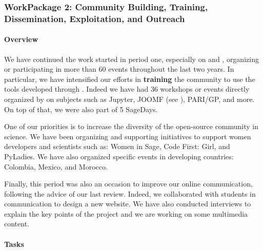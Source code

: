 \subsubsection{WorkPackage 2:  Community Building, Training, Dissemination, Exploitation, and Outreach}
\label{dissem}



\paragraph{Overview}

  We have continued the work started in period one, especially on  and
  , organizing or participating in more than 60 events throughout the last two years.
  In particular, we have intensified our efforts in \textbf{training} the community to use the tools developed through \ODK.
  Indeed we have had 36 workshops or events directly organized by \ODK on subjects such as Jupyter, JOOMF (see ), PARI/GP, and more. On top of that, we were also part of 5 SageDays.

  One of our priorities is to increase the diversity of the open-source community in science. We have been organizing
  and supporting initiatives to support women developers and scientists such as: Women in Sage, Code First: Girl, and
  PyLadies. We have also organized specific events in developing countries: Colombia, Mexico, and Morocco.

  Finally, this period was also an occasion to improve our online communication, following the advice of our last review.
  Indeed, we collaborated with students in communication to design a new website. We have also conducted interviews to explain
  the key points of the project and we are working on some multimedia content.


\paragraph{Tasks}

